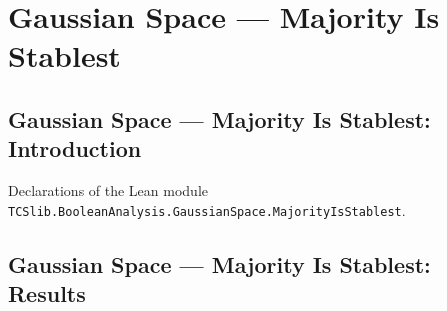 \section{Gaussian Space --- Majority Is Stablest}
\subsection*{Gaussian Space --- Majority Is Stablest: Introduction}

Declarations of the Lean module \texttt{TCSlib.BooleanAnalysis.GaussianSpace.MajorityIsStablest}.

\subsection*{Gaussian Space --- Majority Is Stablest: Results}


